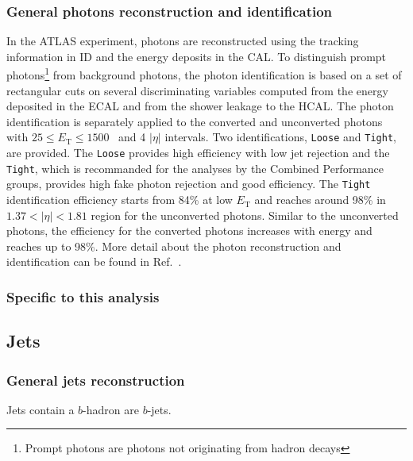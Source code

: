 \subsubsection{General photons reconstruction and identification}
\label{subsubsec:event_photons_general}
In the ATLAS experiment, photons are reconstructed using the tracking information in ID and the energy deposits in the CAL.
To distinguish prompt photons\footnote{Prompt photons are photons not originating from hadron decays} from background photons, the photon identification is based on a set of rectangular cuts on several discriminating variables computed from the energy deposited in the ECAL and from the shower leakage to the HCAL.
The photon identification is separately applied to the converted and unconverted photons with $25 \le E_{\mathrm{T}} \le 1500$~{\GeV} and 4 $|\eta|$ intervals.
Two identifications, \texttt{Loose} and \texttt{Tight}, are provided.
The \texttt{Loose} provides high efficiency with low jet rejection and the \texttt{Tight}, which is recommanded for the analyses by the Combined Performance groups, provides high fake photon rejection and good efficiency.
The \texttt{Tight} identification efficiency starts from 84\% at low $E_{\mathrm{T}}$ and reaches around 98\% in $1.37 < |\eta| < 1.81$ region for the unconverted photons.
Similar to the unconverted photons, the efficiency for the converted photons increases with energy and reaches up to 98\%.
More detail about the photon reconstruction and identification can be found in Ref.~\cite{ATLAS:2011kuc}.


\subsubsection{Specific to this analysis}
\label{subsubsec:event_photons_specific}


\subsection{Jets}
\label{subsec:event_jets}


\subsubsection{General jets reconstruction}
\label{subsubsec:event_jets_general}


Jets contain a $b$-hadron are $b$-jets.

